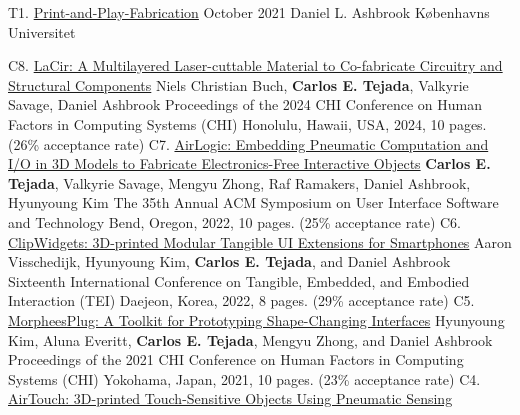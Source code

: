 \pagebreak
{}


    \begin{cvpublications}
      \cvthesis%
        {T1.}
        {\href{https://doi.org/10.31237/osf.io/nd7e9}{Print-and-Play-Fabrication}}%
        {October 2021}
        {Daniel L. Ashbrook}
        {K{\o}benhavns Universitet}
    \end{cvpublications}
    
 

    \begin{cvpublications}
      \cvpublication%
        {C8.}%
        {\href{https://doi.org/10.1145/3613904.3642888}{LaCir: A Multilayered Laser-cuttable Material to Co-fabricate Circuitry and Structural Components}}%
        {Niels Christian Buch, \textbf{Carlos E. Tejada}, Valkyrie Savage, Daniel Ashbrook}
        {Proceedings of the 2024 CHI Conference on Human Factors in Computing Systems (CHI)}%
        {Honolulu, Hawaii, USA, 2024, 10 pages. (26\% acceptance rate)}
      \cvpublication%
        {C7.}%
        {\href{https://doi.org/10.1145/3526113.3545642}{AirLogic: Embedding Pneumatic Computation and I/O in 3D Models to Fabricate Electronics-Free Interactive Objects}}%
        {\textbf{Carlos E. Tejada}, Valkyrie Savage, Mengyu Zhong, Raf Ramakers, Daniel Ashbrook, Hyunyoung Kim}
        {The 35th Annual ACM Symposium on User Interface Software and Technology}
        {Bend, Oregon, 2022, 10 pages. (25\% acceptance rate)}
      \cvpublication%
        {C6.}%
        {\href{https://doi.org/10.1145/3490149.3501314}{ClipWidgets: 3D-printed Modular Tangible UI Extensions for Smartphones}}%
        {Aaron Visschedijk, Hyunyoung Kim, \textbf{Carlos E. Tejada}, and Daniel Ashbrook}%
        {Sixteenth International Conference on Tangible, Embedded, and Embodied Interaction (TEI)}
        {Daejeon, Korea, 2022, 8 pages. (29\% acceptance rate)}
      \cvpublication%
        {C5.}%
        {\href{https://doi.org/10.1145/3411764.3445786}{MorpheesPlug: A Toolkit for Prototyping Shape-Changing Interfaces}}%
        {Hyunyoung Kim, Aluna Everitt, \textbf{Carlos E. Tejada}, Mengyu Zhong, and Daniel Ashbrook}%
        {Proceedings of the 2021 CHI Conference on Human Factors in Computing Systems (CHI)}%
        {Yokohama, Japan, 2021, 10 pages. (23\% acceptance rate)}
      \cvpublication%
        {C4.}%
        {\href{https://doi.org/10.1145/3313831.3376136}{AirTouch: 3D-printed Touch-Sensitive Objects Using Pneumatic Sensing}}%

\end{cvpublications}
